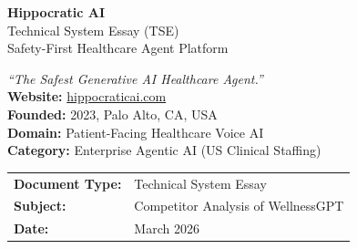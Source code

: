 \documentclass[12pt,a4paper]{article}
\begin{document}
\begin{titlepage}
    \centering\vspace*{2cm}
    {\Huge\bfseries\color{primaryblue} Hippocratic AI}\\[0.5cm]
    {\Large\color{accentgreen} Technical System Essay (TSE)}\\[0.3cm]
    {\large\color{darkgray} Safety-First Healthcare Agent Platform}\\[2cm]

    \begin{mdframed}[backgroundcolor=lightgray, linecolor=primaryblue, linewidth=1.5pt, roundcorner=5pt]
        \centering\vspace{0.3cm}
        \textit{``The Safest Generative AI Healthcare Agent.''}\\[0.3cm]
        \textbf{Website:} \href{https://hippocraticai.com}{hippocraticai.com}\\
        \textbf{Founded:} 2023, Palo Alto, CA, USA\\
        \textbf{Domain:} Patient-Facing Healthcare Voice AI\\
        \textbf{Category:} Enterprise Agentic AI (US Clinical Staffing)\\
        \vspace{0.3cm}
    \end{mdframed}
    \vspace{2cm}
    \begin{tabular}{ll}
        \textbf{Document Type:} & Technical System Essay \\
        \textbf{Subject:}       & Competitor Analysis of WellnessGPT \\
        \textbf{Date:}          & March 2026 \\
    \end{tabular}
\end{titlepage}

\tableofcontents\newpage

\begin{abstract}
\noindent
This TSE provides a detailed technical and strategic analysis of \textbf{Hippocratic AI}, a US-based healthcare AI company that deploys patient-facing voice agents for chronic care, post-discharge management, and administrative automation. It is analyzed here as a primary competitor to WellnessGPT (HeyDoc AI), sharing the agentic AI for healthcare positioning but differing significantly in architecture, market focus, and technical approach.
\end{abstract}
\newpage
\end{document}
